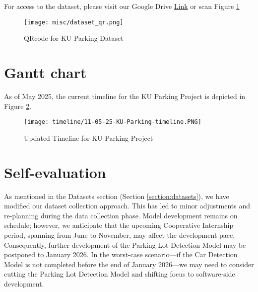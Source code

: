 For access to the dataset, please visit our Google Drive \href{https://drive.google.com/drive/folders/1pOUgcbsFb1mpLc5oywZ2xQdRepm_nVu7?usp=sharing}{Link} or scan Figure \ref{fig:dataset-qr}
\begin{figure}[H]
    \centering
    \texttt{[image: misc/dataset\_qr.png]}
    \caption{QRcode for KU Parking Dataset}
    \label{fig:dataset-qr}
\end{figure}

\section{Gantt chart}
\label{section:gantt-chart}
As of May 2025, the current timeline for the KU Parking Project is depicted in Figure \ref{fig:11-05-25-timeline-dev-progress}.
\begin{figure}[H]
    \centering
    \texttt{[image: timeline/11-05-25-KU-Parking-timeline.PNG]}
    \caption{Updated Timeline for KU Parking Project}
    \label{fig:11-05-25-timeline-dev-progress}
\end{figure}

\section{Self-evaluation}
\label{section:self-evaluation}
As mentioned in the Datasets section (Section \ref{section:datasets}), we have modified our dataset collection approach. This has led to minor adjustments and re-planning during the data collection phase. Model development remains on schedule; however, we anticipate that the upcoming Cooperative Internship period, spanning from June to November, may affect the development pace. Consequently, further development of the Parking Lot Detection Model may be postponed to January 2026. In the worst-case scenario—if the Car Detection Model is not completed before the end of January 2026—we may need to consider cutting the Parking Lot Detection Model and shifting focus to software-side development.